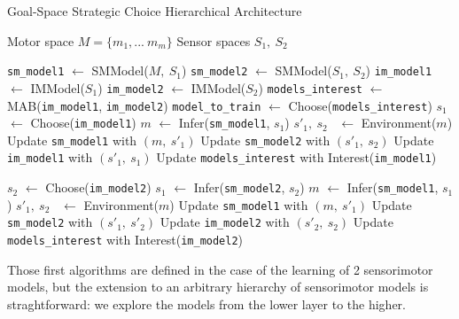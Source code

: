 \documentclass[12pt]{article}
\begin{document}
			
			
			\begin{algorithm}
				\caption{Goal-Space Strategic Choice Hierarchical Architecture}
				\label{algostrat}
				\begin{algorithmic}[1]
					\Require Motor space $M = \{m_1, ...~ m_m\}$
					\Require Sensor spaces $S_1,~S_2$
					
					\State \texttt{sm\_model1} $\gets$ SMModel($M,~S_1$)
					\State \texttt{sm\_model2} $\gets$ SMModel($S_1,~S_2$)
					\State \texttt{im\_model1} $\gets$ IMModel($S_1$)
					\State \texttt{im\_model2} $\gets$ IMModel($S_2$)
					\State \texttt{models\_interest} $\gets$ MAB(\texttt{im\_model1}, \texttt{im\_model2})
					\Loop
						\State \texttt{model\_to\_train} $\gets$ Choose(\texttt{models\_interest})
							\State $s_1$ $\gets$ Choose(\texttt{im\_model1})
							\State $m$ $\gets$ Infer(\texttt{sm\_model1}, $s_1$)
							\State $s'_1,~s_2$~ $\gets$ Environment($m$)
							\State Update \texttt{sm\_model1} with $(m,~s'_1)$
							\State Update \texttt{sm\_model2} with $(s'_1,~s_2)$
							\State Update \texttt{im\_model1} with $(s'_1,~s_1)$
							\State Update \texttt{models\_interest} with Interest(\texttt{im\_model1})
							
													
							\State $s_2$ $\gets$ Choose(\texttt{im\_model2})
							\State $s_1$ $\gets$ Infer(\texttt{sm\_model2}, $s_2$)
							\State $m$ $\gets$ Infer(\texttt{sm\_model1}, $s_1$)
							\State $s'_1,~s_2$~ $\gets$ Environment($m$)
							\State Update \texttt{sm\_model1} with $(m,~s'_1)$
							\State Update \texttt{sm\_model2} with $(s'_1,~s'_2)$
							\State Update \texttt{im\_model2} with $(s'_2,~s_2)$
							\State Update \texttt{models\_interest} with Interest(\texttt{im\_model2})
						\EndIf
					\EndLoop
				\end{algorithmic}
			\end{algorithm}
			
			Those first algorithms are defined in the case of the learning of 2 sensorimotor models, but the extension to an arbitrary hierarchy of 
			sensorimotor models is straghtforward: we explore the models from the lower layer to the higher.
			
\end{document}
